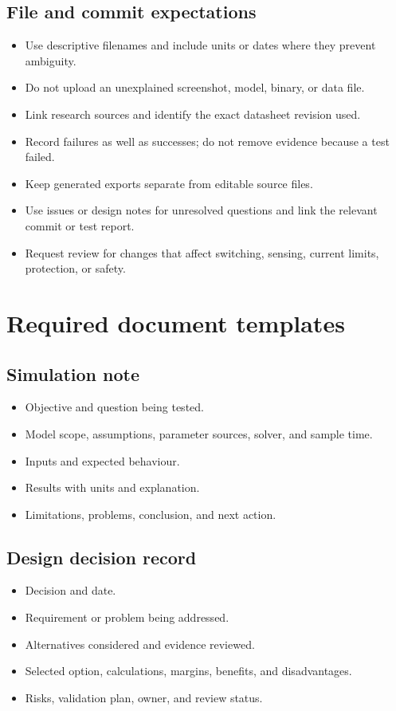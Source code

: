 \documentclass[11pt,a4paper]{article}
\begin{document}
\subsection{File and commit expectations}

\begin{itemize}
  \item Use descriptive filenames and include units or dates where they prevent ambiguity.
  \item Do not upload an unexplained screenshot, model, binary, or data file.
  \item Link research sources and identify the exact datasheet revision used.
  \item Record failures as well as successes; do not remove evidence because a test failed.
  \item Keep generated exports separate from editable source files.
  \item Use issues or design notes for unresolved questions and link the relevant commit or test report.
  \item Request review for changes that affect switching, sensing, current limits, protection, or safety.
\end{itemize}

\section{Required document templates}

\subsection{Simulation note}
\begin{itemize}
  \item Objective and question being tested.
  \item Model scope, assumptions, parameter sources, solver, and sample time.
  \item Inputs and expected behaviour.
  \item Results with units and explanation.
  \item Limitations, problems, conclusion, and next action.
\end{itemize}

\subsection{Design decision record}
\begin{itemize}
  \item Decision and date.
  \item Requirement or problem being addressed.
  \item Alternatives considered and evidence reviewed.
  \item Selected option, calculations, margins, benefits, and disadvantages.
  \item Risks, validation plan, owner, and review status.
\end{itemize}
\end{document}
